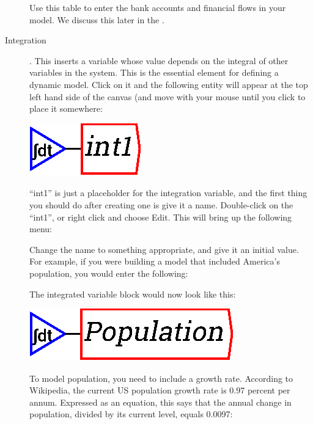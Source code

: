 \begin{description}
 
Use this table to enter the bank accounts and financial flows in your model. We discuss this later in the .

\item[Integration] .\label{Integrate}
  This inserts a variable whose value depends on the integral of other
  variables in the system. This is the essential element for defining
  a dynamic model. Click on it and the following entity will appear at
  the top left hand side of the canvas (and move with your mouse until
  you click to place it somewhere:

\begin{center}
\includegraphics{images/NewItem39.eps}
\end{center}

``int1'' is just a placeholder for the integration variable, and the
first thing you should do after creating one is give it a
name. Double-click on the ``int1'', or right click and choose
Edit. This will bring up the following menu:

\begin{center}
\end{center}

Change the name to something appropriate, and give it an initial
value. For example, if you were building a model that included
America's population, you would enter the following:

\begin{center}
\end{center}


The integrated variable block would now look like this:

\begin{center}
\includegraphics{images/NewItem42.eps}
\end{center}


To model population, you need to include a growth rate. According to
Wikipedia, the current US population growth rate is 0.97 percent per
annum.  Expressed as an equation, this says that the annual change in
population, divided by its current level, equals 0.0097: 


\end{description}
